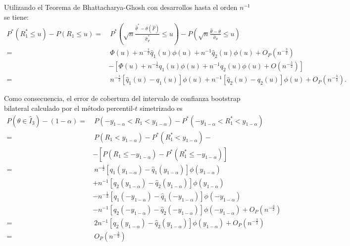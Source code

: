 \documentclass[
]{book}
\theoremstyle{break}
\theoremstyle{nonumberplain}
\begin{document}
Utilizando el Teorema de Bhattacharya-Ghosh con desarrollos hasta el
orden \(n^{-1}\) se tiene:
\[\begin{aligned}
P^{\ast}\left( R_1^{\ast}\leq u \right) -P\left( R_1\leq u \right) 
=&\ P^{\ast}\left( \sqrt{n}\frac{\hat{\theta}^{\ast}-\theta \left( \hat{F}
 \right)}{\hat{\sigma}_{\theta }^{\ast}}\leq u \right) -P\left( \sqrt{n}
\frac{\hat{\theta}-\theta }{\hat{\sigma}_{\theta }}\leq u \right) \\
=&\ \Phi \left( u \right) +n^{-\frac{1}{2}}\hat{q}_1\left( u \right) \phi
\left( u \right) +n^{-1}\hat{q}_2\left( u \right) \phi \left( u \right)
+O_{P}\left( n^{-\frac{3}{2}} \right) \\
& -\left[ \Phi \left( u \right) +n^{-\frac{1}{2}}q_1\left( u \right) \phi
\left( u \right) +n^{-1}q_2\left( u \right) \phi \left( u \right) +O\left(
n^{-\frac{3}{2}} \right) \right] \\
=&\ n^{-\frac{1}{2}}\left[ \hat{q}_1\left( u \right) -q_1\left( u \right) 
\right] \phi \left( u \right) 
+n^{-1}\left[ \hat{q}_2\left( u \right) -q_2\left( u \right) \right] \phi
\left( u \right) +O_{P}\left( n^{-\frac{3}{2}} \right).
\end{aligned}\]

Como consecuencia, el error de cobertura del intervalo de confianza
bootstrap bilateral calculado por el método percentil-\(t\) simetrizado
es
\[\begin{aligned}
P\left( \theta \in \hat{I}_3 \right) -\left( 1-\alpha \right) 
=&\ P\left(-y_{1-\alpha }<R_1<y_{1-\alpha } \right) -P^{\ast}\left( -y_{1-\alpha
}<R_1^{\ast}<y_{1-\alpha } \right) \\
=&\ P\left( R_1<y_{1-\alpha } \right) -P^{\ast}\left( R_1^{\ast
}<y_{1-\alpha } \right) - \\
&-\left[ P\left( R_1\leq -y_{1-\alpha } \right) -P^{\ast}\left( R_1^{\ast
}\leq -y_{1-\alpha } \right) \right] \\
=&\ n^{-\frac{1}{2}}\left[ q_1\left( y_{1-\alpha } \right) -\hat{q}_1\left(
y_{1-\alpha } \right) \right] \phi \left( y_{1-\alpha } \right) \\
&+n^{-1}\left[ q_2\left( y_{1-\alpha } \right) -\hat{q}_2\left(
y_{1-\alpha } \right) \right] \phi \left( y_{1-\alpha } \right) \\
&-n^{-\frac{1}{2}}\left[ q_1\left( -y_{1-\alpha } \right) -\hat{q}_1\left(
-y_{1-\alpha } \right) \right] \phi \left( -y_{1-\alpha } \right) \\
&-n^{-1}\left[ q_2\left( -y_{1-\alpha } \right) -\hat{q}_2\left(
-y_{1-\alpha } \right) \right] \phi \left( -y_{1-\alpha } \right) +O_{P}\left(
n^{-\frac{3}{2}} \right) \\
=&\ 2n^{-1}\left[ q_2\left( y_{1-\alpha } \right) -\hat{q}_2\left(
y_{1-\alpha } \right) \right] \phi \left( y_{1-\alpha } \right) +O_{P}\left(
n^{-\frac{3}{2}} \right) \\
=&\ O_{P}\left( n^{-\frac{3}{2}} \right)
\end{aligned}\]
\end{document}
